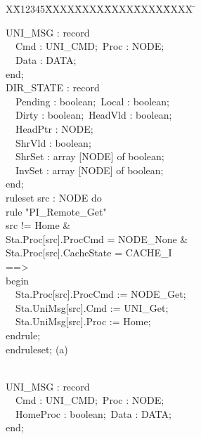 \documentclass{llncs}
\newlength{\fminilength}
\newenvironment{fmini}[1][\linewidth]
  {\setlength{\fminilength}{#1\fboxsep-2\fboxrule}%
   \vspace{2ex}\noindent\begin{lrbox}{\fminibox}\begin{minipage}{\fminilength}%
   \mbox{ }\hfill\vspace{-2.5ex}}%
  {\end{minipage}\end{lrbox}\vspace{1ex}\hspace{0ex}%
   \framebox{\usebox{\fminibox}}}
\newenvironment{specification}
{\noindent\scriptsize
\tt\begin{fmini}\begin{tabbing}X\=X12345\=XXXX\=XXXX\=XXXX\=XXXX\=XXXX
\=\+\kill} {\end{tabbing}\normalfont\end{fmini}}
\def \twoSpaces {\ \ }
\newcommand{\forget}[1]{}
\def \twoSpaces {\ \ }
\begin{document}
\begin{specification}
\begin{minipage}[t]{0.5\linewidth}
 UNI\_MSG : record\\
\twoSpaces    Cmd : UNI\_CMD;\     Proc : NODE;\\
\twoSpaces     Data : DATA;\\
  end;\\

 DIR\_STATE : record\\
\twoSpaces     Pending : boolean;\     Local : boolean;\\
\twoSpaces     Dirty : boolean;\      HeadVld : boolean;\\
\twoSpaces     HeadPtr : NODE;\\
\twoSpaces     ShrVld : boolean;\\
\twoSpaces     ShrSet : array [NODE] of boolean;\\
\twoSpaces     InvSet : array [NODE] of boolean;\\
  end;  \\

  ruleset src : NODE do\\
rule "PI\_Remote\_Get"\\
  src != Home \&\\
  Sta.Proc[src].ProcCmd = NODE\_None \&\\
  Sta.Proc[src].CacheState = CACHE\_I\\
==>\\

begin\\
\twoSpaces    Sta.Proc[src].ProcCmd := NODE\_Get;\\
\twoSpaces    Sta.UniMsg[src].Cmd := UNI\_Get;\\
\twoSpaces    Sta.UniMsg[src].Proc := Home;\\
endrule;\\
endruleset;
\center (a)\\
\twoSpaces \\
\end{minipage}

\begin{minipage}[t]{0.4\linewidth}

UNI\_MSG : record\\
\twoSpaces     Cmd : UNI\_CMD;\     Proc : NODE;\\
\twoSpaces     HomeProc : boolean;\       Data : DATA;\\
  end;\\



\end{minipage}
\end{specification}
\end{document}
